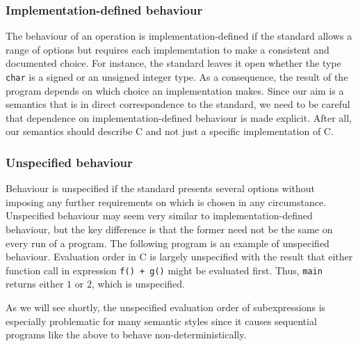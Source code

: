\documentclass[a4paper,12pt]{scrbook}
\theoremstyle{plain}
\theoremstyle{definition}
\begin{document}
\subsubsection{Implementation-defined behaviour}
The behaviour of an operation is implementation-defined if the standard allows a
range of options but requires each implementation to make a consistent and
documented choice. For instance, the standard leaves it open whether the type
\lstinline{char} is a signed or an unsigned integer type. As a consequence, the
result of the program  depends on which choice
an implementation makes. Since our aim is a semantics that is in direct
correspondence to the standard, we need to be careful that dependence on
implementation-defined behaviour is made explicit. After all, our semantics
should describe C and not just a specific implementation of C.

% 

\subsubsection{Unspecified behaviour}\label{unspecifiedBehaviour}
Behaviour is unspecified if the standard presents several options without
imposing any further requirements on which is chosen in any circumstance.
Unspecified behaviour may seem very similar to implementation-defined behaviour,
but the key difference is that the former need not be the same on every run of a
program. The following program is an example of unspecified behaviour.
 Evaluation order in C is largely unspecified
with the result that either function call in expression \lstinline{f() + g()}
might be evaluated first. Thus, \lstinline{main} returns either $1$ or $2$,
which is unspecified.

As we will see shortly, the unspecified evaluation order of subexpressions is
especially problematic for many semantic styles since it causes sequential
programs like the above to behave non-deterministically.
\end{document}
